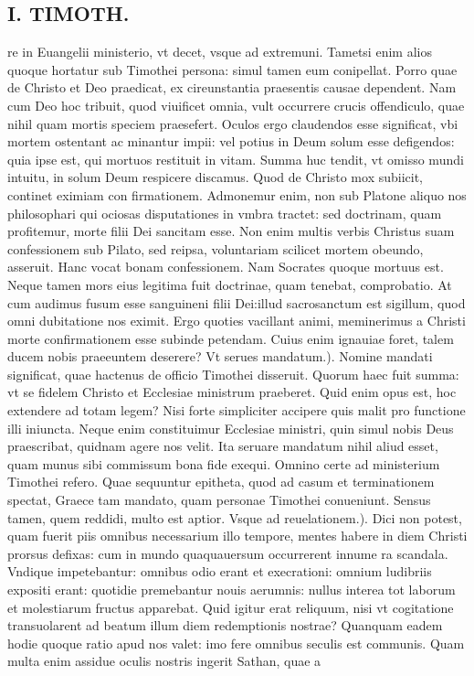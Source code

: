 \documentclass{article}
\begin{document}
\begin{pages}
\section*{I. TIMOTH. }
\marginpar{[ p.80 ]}\pstart re in Euangelii ministerio, vt decet, vsque ad extremuni. Tametsi enim alios quoque hortatur sub Timothei persona: simul tamen eum conipellat. Porro quae de Christo et Deo praedicat, ex cireunstantia praesentis causae dependent. Nam cum Deo hoc tribuit, quod viuificet omnia, vult occurrere crucis offendiculo, quae nihil quam mortis speciem praesefert. Oculos ergo claudendos esse significat, vbi mortem ostentant ac minantur impii: vel potius in Deum solum esse defigendos: quia ipse est, qui mortuos restituit in vitam. Summa huc tendit, vt omisso mundi intuitu, in solum Deum respicere discamus. Quod de Christo mox subiicit, continet eximiam con firmationem. Admonemur enim, non sub Platone aliquo nos philosophari qui ociosas disputationes in vmbra tractet: sed doctrinam, quam profitemur, morte filii Dei sancitam esse. Non enim multis verbis Christus suam confessionem sub Pilato, sed reipsa, voluntariam scilicet mortem obeundo, asseruit. Hanc vocat bonam confessionem. Nam Socrates quoque mortuus est. Neque tamen mors eius legitima fuit doctrinae, quam tenebat, comprobatio. At cum audimus fusum esse sanguineni filii Dei:illud sacrosanctum est sigillum, quod omni dubitatione nos eximit. Ergo quoties vacillant animi, meminerimus a Christi morte confirmationem esse subinde petendam. Cuius enim ignauiae foret, talem ducem nobis praeeuntem deserere?  \pend\pstart Vt serues mandatum.). Nomine mandati significat, quae hactenus de officio Timothei disseruit. Quorum haec fuit summa: vt se fidelem Christo et Ecclesiae ministrum praeberet. Quid enim opus est, hoc extendere ad totam legem? Nisi forte simpliciter accipere quis malit pro functione illi iniuncta. Neque enim constituimur Ecclesiae ministri, quin simul nobis Deus praescribat, quidnam agere nos velit. Ita seruare mandatum nihil aliud esset, quam munus sibi commissum bona fide exequi. Omnino certe ad ministerium Timothei refero. Quae sequuntur epitheta, quod ad casum et terminationem spectat, Graece tam mandato, quam personae Timothei conueniunt. Sensus tamen, quem reddidi, multo est aptior.  \pend\pstart Vsque ad reuelationem.). Dici non potest, quam fuerit piis omnibus necessarium illo tempore, mentes habere in diem Christi prorsus defixas: cum in mundo quaquauersum occurrerent innume ra scandala. Vndique impetebantur: omnibus odio erant et execrationi: omnium ludibriis expositi erant: quotidie premebantur nouis aerumnis: nullus interea tot laborum et molestiarum fructus apparebat. Quid igitur erat reliquum, nisi vt cogitatione transuolarent ad beatum illum diem redemptionis nostrae? Quanquam eadem hodie quoque ratio apud nos valet: imo fere omnibus seculis est communis. Quam multa enim assidue oculis nostris ingerit Sathan, quae a\pend

\end{pages}
\end{document}
